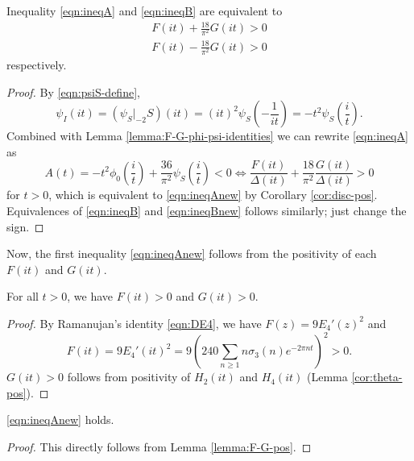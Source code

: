 \begin{lemma}\label{lemma:ineqABnew-equiv}
Inequality \eqref{eqn:ineqA} and \eqref{eqn:ineqB} are equivalent to
\begin{align}
    F(it) + \frac{18}{\pi^2} G(it) > 0 \label{eqn:ineqAnew} \\
    F(it) - \frac{18}{\pi^2} G(it) > 0 \label{eqn:ineqBnew}
\end{align}
respectively.
\end{lemma}
\begin{proof}
By \eqref{eqn:psiS-define},
\begin{equation}
    \psi_I(it) = (\psi_S|_{-2}S)(it) = (it)^{2}\psi_S\left(-\frac{1}{it}\right) = -t^2 \psi_S\left(\frac{i}{t}\right).
\end{equation}
Combined with Lemma \ref{lemma:F-G-phi-psi-identities} we can rewrite \eqref{eqn:ineqA} as
\begin{equation}
    A(t) = -t^2 \phi_0\left(\frac{i}{t}\right) + \frac{36}{\pi^2} \psi_S\left(\frac{i}{t}\right) < 0 \Leftrightarrow \frac{F(it)}{\Delta(it)} + \frac{18}{\pi^2} \frac{G(it)}{\Delta(it)} > 0
\end{equation}
for $t > 0$, which is equivalent to \eqref{eqn:ineqAnew} by Corollary \ref{cor:disc-pos}.
Equivalences of \eqref{eqn:ineqB} and \eqref{eqn:ineqBnew} follows similarly; just change the sign.
\end{proof}


Now, the first inequality \eqref{eqn:ineqAnew} follows from the positivity of each $F(it)$ and $G(it)$.

\begin{lemma}\label{lemma:F-G-pos}
For all $t > 0$, we have $F(it) > 0$ and $G(it) > 0$.
\end{lemma}
\begin{proof}
By Ramanujan's identity \eqref{eqn:DE4}, we have $F(z) = 9 E_4'(z)^2$ and
\begin{equation}
    F(it) = 9E_4'(it)^2 = 9 \left(240\sum_{n \geq 1} n \sigma_3(n) e^{-2 \pi n t} \right)^{2} > 0.
\end{equation}
$G(it) > 0$ follows from positivity of $H_2(it)$ and $H_4(it)$ (Lemma \ref{cor:theta-pos}).
\end{proof}

\begin{corollary}\label{cor:ineqAnew}
\eqref{eqn:ineqAnew} holds.
\end{corollary}
\begin{proof}
This directly follows from Lemma \ref{lemma:F-G-pos}.
\end{proof}


